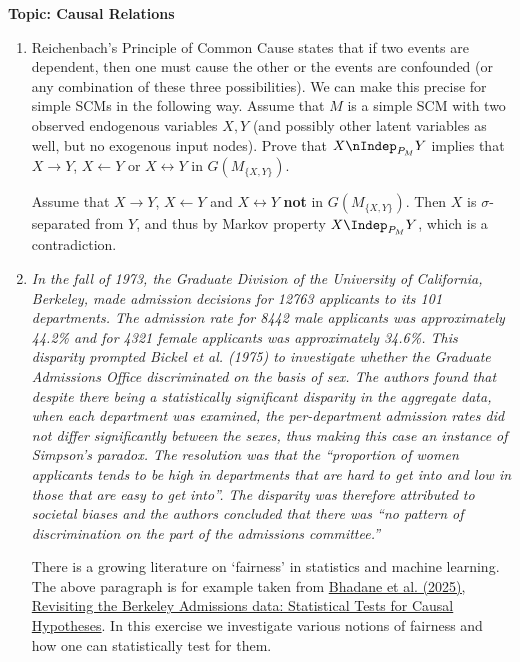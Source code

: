 
\flushleft\textbf{Topic: Causal Relations}

\begin{enumerate}[label=14.\arabic*]
	\item Reichenbach's Principle of Common Cause states that if two events are dependent,
	then one must cause the other or the events are confounded (or any combination of these three possibilities).
	We can make this precise for simple SCMs in the following way. Assume that $M$
	is a simple SCM with two observed endogenous variables $X,Y$ (and possibly other
	latent variables as well, but no exogenous input nodes). Prove that
	$X \nIndep_{P_{M}} Y$
	implies that $X \to Y$,
	$X \leftarrow Y$ or $X \leftrightarrow Y$ in $G(M_{\{X,Y\}})$.

	\begin{ungradedsolution}
		Assume that $X \to Y$, $X \leftarrow Y$ and $X \leftrightarrow Y$ \textbf{not} in $G(M_{\{X,Y\}})$. Then $X$ is $\sigma$-separated from $Y$, and thus by Markov property $X \Indep_{P_{M}} Y$, which is a contradiction.
	\end{ungradedsolution}



	\item \emph{In the fall of 1973, the Graduate Division of the University of California, Berkeley, made admission decisions for 12763 applicants to its 101 departments. The admission rate for 8442 male applicants was approximately 44.2\% and for 4321 female applicants was approximately 34.6\%. This disparity prompted Bickel et al. (1975) to investigate whether the Graduate Admissions Office discriminated on the basis of sex. The authors found that despite there being a statistically significant disparity in the aggregate data, when each department was examined, the per-department admission rates did not differ significantly between the sexes, thus making this case an instance of Simpson's paradox. The resolution was that the ``proportion of women applicants tends to be high in departments that are hard to get into and low in those that are easy to get into''. The disparity was therefore attributed to societal biases and the authors concluded that there was ``no pattern of discrimination on the part of the admissions committee.''}

	There is a growing literature on `fairness' in statistics and machine learning. The above paragraph is for example taken from \href{https://arxiv.org/pdf/2502.10161}{Bhadane et al. (2025), Revisiting the Berkeley Admissions data: Statistical Tests for Causal Hypotheses}. In this exercise we investigate various notions of fairness and how one can statistically test for them.


\end{enumerate}

